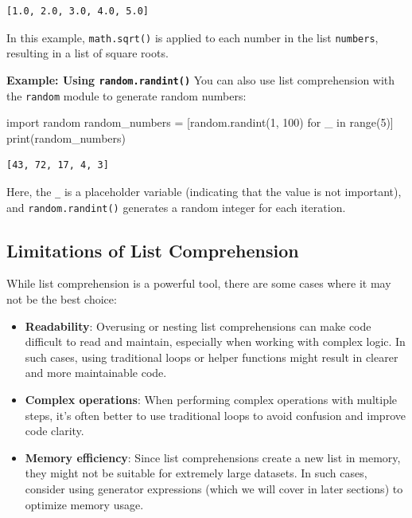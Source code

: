\documentclass[
  letterpaper,
  DIV=11,
  numbers=noendperiod]{scrreprt}
\newenvironment{Shaded}{\begin{snugshade}}{\end{snugshade}}
\newcommand{\BuiltInTok}[1]{\textcolor[rgb]{0.00,0.23,0.31}{#1}}
\newcommand{\ControlFlowTok}[1]{\textcolor[rgb]{0.00,0.23,0.31}{#1}}
\newcommand{\DecValTok}[1]{\textcolor[rgb]{0.68,0.00,0.00}{#1}}
\newcommand{\ImportTok}[1]{\textcolor[rgb]{0.00,0.46,0.62}{#1}}
\newcommand{\KeywordTok}[1]{\textcolor[rgb]{0.00,0.23,0.31}{#1}}
\newcommand{\NormalTok}[1]{\textcolor[rgb]{0.00,0.23,0.31}{#1}}
\newcommand{\OperatorTok}[1]{\textcolor[rgb]{0.37,0.37,0.37}{#1}}
\begin{document}
\begin{verbatim}
[1.0, 2.0, 3.0, 4.0, 5.0]
\end{verbatim}

In this example, \texttt{math.sqrt()} is applied to each number in the
list \texttt{numbers}, resulting in a list of square roots.

\textbf{Example: Using \texttt{random.randint()}} You can also use list
comprehension with the \texttt{random} module to generate random
numbers:

\begin{Shaded}
\begin{Highlighting}[]
\ImportTok{import}\NormalTok{ random}
\NormalTok{random\_numbers }\OperatorTok{=}\NormalTok{ [random.randint(}\DecValTok{1}\NormalTok{, }\DecValTok{100}\NormalTok{) }\ControlFlowTok{for}\NormalTok{ \_ }\KeywordTok{in} \BuiltInTok{range}\NormalTok{(}\DecValTok{5}\NormalTok{)]}
\BuiltInTok{print}\NormalTok{(random\_numbers)  }
\end{Highlighting}
\end{Shaded}

\begin{verbatim}
[43, 72, 17, 4, 3]
\end{verbatim}

Here, the \texttt{\_} is a placeholder variable (indicating that the
value is not important), and \texttt{random.randint()} generates a
random integer for each iteration.

\hypertarget{limitations-of-list-comprehension}{%
\subsection{Limitations of List
Comprehension}\label{limitations-of-list-comprehension}}

While list comprehension is a powerful tool, there are some cases where
it may not be the best choice:

\begin{itemize}
\item
  \textbf{Readability}: Overusing or nesting list comprehensions can
  make code difficult to read and maintain, especially when working with
  complex logic. In such cases, using traditional loops or helper
  functions might result in clearer and more maintainable code.
\item
  \textbf{Complex operations}: When performing complex operations with
  multiple steps, it's often better to use traditional loops to avoid
  confusion and improve code clarity.
\item
  \textbf{Memory efficiency}: Since list comprehensions create a new
  list in memory, they might not be suitable for extremely large
  datasets. In such cases, consider using generator expressions (which
  we will cover in later sections) to optimize memory usage.
\end{itemize}
\end{document}
